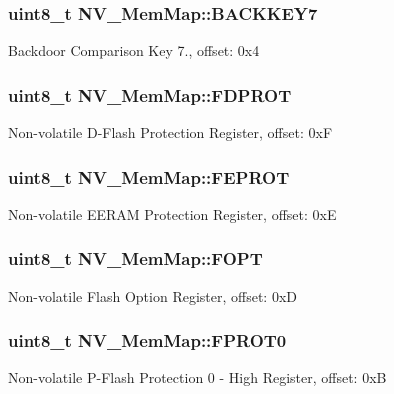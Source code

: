 \subsubsection[{B\+A\+C\+K\+K\+E\+Y7}]{\setlength{\rightskip}{0pt plus 5cm}uint8\+\_\+t N\+V\+\_\+\+Mem\+Map\+::\+B\+A\+C\+K\+K\+E\+Y7}\label{struct_n_v___mem_map_a398eb38f0e2b4a9da6562e42ed7a40b3}
Backdoor Comparison Key 7., offset\+: 0x4 \hypertarget{struct_n_v___mem_map_a335c056263e0dae36f7a3bb82d08bce8}{}
\subsubsection[{F\+D\+P\+R\+O\+T}]{\setlength{\rightskip}{0pt plus 5cm}uint8\+\_\+t N\+V\+\_\+\+Mem\+Map\+::\+F\+D\+P\+R\+O\+T}\label{struct_n_v___mem_map_a335c056263e0dae36f7a3bb82d08bce8}
Non-\/volatile D-\/\+Flash Protection Register, offset\+: 0x\+F \hypertarget{struct_n_v___mem_map_a8de06ecef5c15ac5c29f613d79c9e491}{}
\subsubsection[{F\+E\+P\+R\+O\+T}]{\setlength{\rightskip}{0pt plus 5cm}uint8\+\_\+t N\+V\+\_\+\+Mem\+Map\+::\+F\+E\+P\+R\+O\+T}\label{struct_n_v___mem_map_a8de06ecef5c15ac5c29f613d79c9e491}
Non-\/volatile E\+E\+R\+A\+M Protection Register, offset\+: 0x\+E \hypertarget{struct_n_v___mem_map_a3a3c0ec53723a865f6686bf4696800ba}{}
\subsubsection[{F\+O\+P\+T}]{\setlength{\rightskip}{0pt plus 5cm}uint8\+\_\+t N\+V\+\_\+\+Mem\+Map\+::\+F\+O\+P\+T}\label{struct_n_v___mem_map_a3a3c0ec53723a865f6686bf4696800ba}
Non-\/volatile Flash Option Register, offset\+: 0x\+D \hypertarget{struct_n_v___mem_map_a93d4a444c27eba9b9d8939e52440e8e8}{}
\subsubsection[{F\+P\+R\+O\+T0}]{\setlength{\rightskip}{0pt plus 5cm}uint8\+\_\+t N\+V\+\_\+\+Mem\+Map\+::\+F\+P\+R\+O\+T0}\label{struct_n_v___mem_map_a93d4a444c27eba9b9d8939e52440e8e8}
Non-\/volatile P-\/\+Flash Protection 0 -\/ High Register, offset\+: 0x\+B \hypertarget{struct_n_v___mem_map_a87204afdff32b371c03caafdf5a07b69}{}
